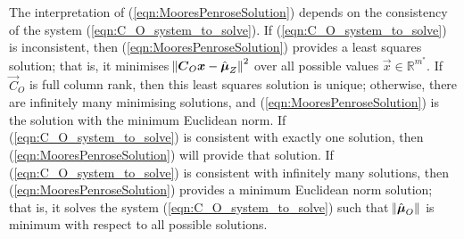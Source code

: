 \documentclass[12pt,a4paper]{article}
\begin{document}
\begin{appendices}
\begin{enumerate}
    The interpretation of (\ref{eqn:MooresPenroseSolution}) depends on the consistency of the system (\ref{eqn:C_O_system_to_solve}). 
    If (\ref{eqn:C_O_system_to_solve}) is inconsistent, then (\ref{eqn:MooresPenroseSolution}) provides a least squares solution; that is, it minimises $\norm{\vec{C}_O\vec{x} - \hat{\vec{\mu}}_Z}^2$ over all possible values $\vec{x} \in \mathbb{R}^{m^*}$. 
    If $\vec{C}_O$ is full column rank, then this least squares solution is unique; otherwise, there are infinitely many minimising solutions, and (\ref{eqn:MooresPenroseSolution}) is the solution with the minimum Euclidean norm.
    If (\ref{eqn:C_O_system_to_solve}) is consistent with exactly one solution, then  (\ref{eqn:MooresPenroseSolution}) will provide that solution. 
    If (\ref{eqn:C_O_system_to_solve}) is consistent with infinitely many solutions, then  (\ref{eqn:MooresPenroseSolution}) provides a minimum Euclidean norm solution; that is, it solves the system (\ref{eqn:C_O_system_to_solve}) such that $\norm{\hat{\vec{\mu}}_O}$ is minimum with respect to all possible solutions.
    

    

    
    

\end{enumerate}
\end{appendices}
\end{document}
